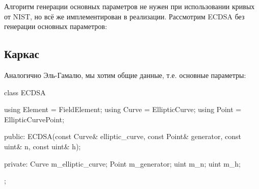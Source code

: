 Алгоритм генерации основных параметров не нужен при использовании кривых от NIST, но всё же имплементирован в реализации. Рассмотрим ECDSA без генерации основных параметров:
\subsection{Каркас}
Аналогично Эль-Гамалю, мы хотим общие данные, т.е. основные параметры:
\begin{cppcode}
class ECDSA {
    using Element = FieldElement;
    using Curve = EllipticCurve;
    using Point = EllipticCurvePoint;

public:
    ECDSA(const Curve& elliptic_curve, const Point& generator, const uint& n, const uint& h);

private:
    Curve m_elliptic_curve;
    Point m_generator;
    uint m_n;
    uint m_h;
};
  \end{cppcode}
